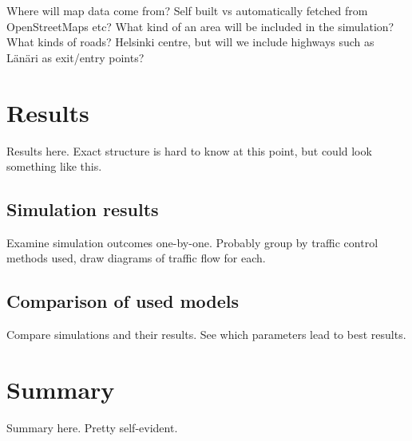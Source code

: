 \documentclass[english, 12pt, a4paper, elec, utf8, pdfa, online]{aaltothesis}
\begin{document}
Where will map data come from? Self built vs automatically fetched from OpenStreetMaps etc? What kind of an area will be included in the simulation? What kinds of roads? Helsinki centre, but will we include highways such as Länäri as exit/entry points?

\clearpage

\section{Results}

Results here. Exact structure is hard to know at this point, but could look something like this.

\subsection{Simulation results}

Examine simulation outcomes one-by-one. Probably group by traffic control methods used, draw diagrams of traffic flow for each.

\subsection{Comparison of used models}

Compare simulations and their results. See which parameters lead to best results.

\clearpage

\section{Summary} 

Summary here. Pretty self-evident.

\clearpage

\thesisbibliography

{}


\clearpage

\thesisappendix
\end{document}
